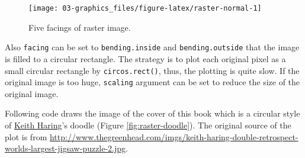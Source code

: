 \documentclass[]{book}
\theoremstyle{definition}
\theoremstyle{definition}
\theoremstyle{remark}
\begin{document}
\begin{figure}

{\centering \texttt{[image: 03-graphics\_files/figure-latex/raster-normal-1]} 

}

\caption{Five facings of raster image.}\label{fig:raster-normal}
\end{figure}

Also \texttt{facing} can be set to \texttt{bending.inside} and
\texttt{bending.outside} that the image is filled to a circular
rectangle. The strategy is to plot each original pixel as a small
circular rectangle by \texttt{circos.rect()}, thus, the plotting is
quite slow. If the original image is too huge, \texttt{scaling} argument
can be set to reduce the size of the original image.

Following code draws the image of the cover of this book which is a
circular style of
\href{https://en.wikipedia.org/wiki/Keith_Haring}{Keith Haring}'s doodle
(Figure \ref{fig:raster-doodle}). The original source of the plot is
from
\url{http://www.thegreenhead.com/imgs/keith-haring-double-retrospect-worlds-largest-jigsaw-puzzle-2.jpg}.
\end{document}
